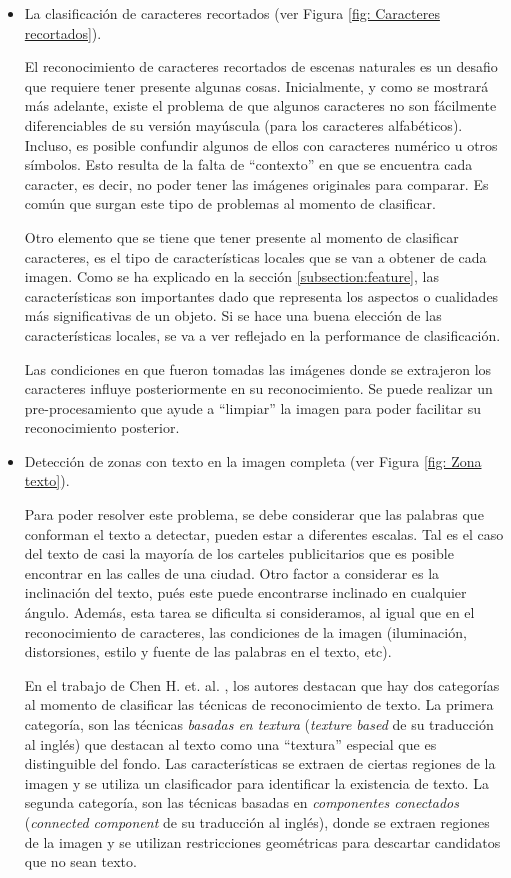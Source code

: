 	\begin{itemize}
		\item La clasificación de caracteres recortados (ver Figura \ref{fig: Caracteres recortados}).
		
		El reconocimiento de caracteres recortados de escenas naturales es un desafio que requiere tener presente algunas cosas. Inicialmente, y como se mostrará más adelante, existe el problema de que algunos caracteres no son fácilmente diferenciables de su versión mayúscula (para los caracteres alfabéticos). Incluso, es posible confundir algunos de ellos con caracteres numérico u otros símbolos. Esto resulta de la falta de ``contexto'' en que se encuentra cada caracter, es decir, no poder tener las imágenes originales para comparar. Es común que surgan este tipo de problemas al momento de clasificar.
				
		Otro elemento que se tiene que tener presente al momento de clasificar caracteres, es el tipo de características locales que se van a obtener de cada imagen. Como se ha explicado en la sección \ref{subsection:feature}, las características son importantes dado que representa los aspectos o cualidades más significativas de un objeto. Si se hace una buena elección de las características locales, se va a ver reflejado en la performance de clasificación.
		
		Las condiciones en que fueron tomadas las imágenes donde se extrajeron los caracteres influye posteriormente en su reconocimiento. Se puede realizar un pre-procesamiento que ayude a ``limpiar'' la imagen para poder facilitar su reconocimiento posterior.
		
		\item Detección de zonas con texto en la imagen completa (ver Figura \ref{fig: Zona texto}).
		
		Para poder resolver este problema, se debe considerar que las palabras que conforman el texto a detectar, pueden estar a diferentes escalas. Tal es el caso del texto de casi la mayoría de los carteles publicitarios que es posible encontrar en las calles de una ciudad. Otro factor a considerar es la inclinación del texto, pués este puede encontrarse inclinado en cualquier ángulo. Además, esta tarea se dificulta si consideramos, al igual que en el reconocimiento de caracteres, las condiciones de la imagen (iluminación, distorsiones, estilo y fuente de las palabras en el texto, etc).
		
		En el trabajo de Chen H. et. al. \cite{ChenH11}, los autores destacan que hay dos categorías al momento de clasificar las técnicas de reconocimiento de texto. La primera categoría, son las técnicas \textit{basadas en textura} (\textit{texture based} de su traducción al inglés) que destacan al texto como una ``textura'' especial que es distinguible del fondo. Las características se extraen de ciertas regiones de la imagen y se utiliza un clasificador para identificar la existencia de texto. La segunda categoría, son las técnicas basadas en \textit{componentes conectados} (\textit{connected component} de su traducción al inglés), donde se extraen regiones de la imagen y se utilizan restricciones geométricas para descartar candidatos que no sean texto.
		

\end{itemize}

